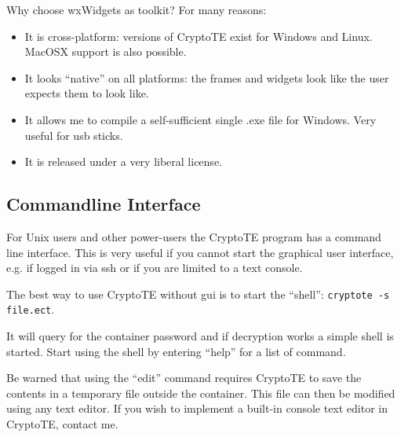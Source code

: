 \documentclass[a4paper,12pt,twoside]{article}
\begin{document}
Why choose wxWidgets as toolkit? For many reasons:

\begin{itemize}
  \item It is cross-platform: versions of CryptoTE exist for Windows and Linux. MacOSX support is also possible.
  \item It looks ``native'' on all platforms: the frames and widgets look like the user expects them to look like.
  \item It allows me to compile a self-sufficient single .exe file for Windows. Very useful for usb sticks.
  \item It is released under a very liberal license.
\end{itemize}

\subsection{Commandline Interface}\label{Commandline}

For Unix users and other power-users the CryptoTE program has a command line interface. This is very useful if you cannot start the graphical user interface, e.g. if logged in via ssh or if you are limited to a text console.

The best way to use CryptoTE without gui is to start the ``shell'': \texttt{cryptote -s file.ect}.

It will query for the container password and if decryption works a simple shell is started. Start using the shell by entering ``help'' for a list of command.

Be warned that using the ``edit'' command requires CryptoTE to save the contents in a temporary file outside the container. This file can then be modified using any text editor. If you wish to implement a built-in console text editor in CryptoTE, contact me.
\end{document}
